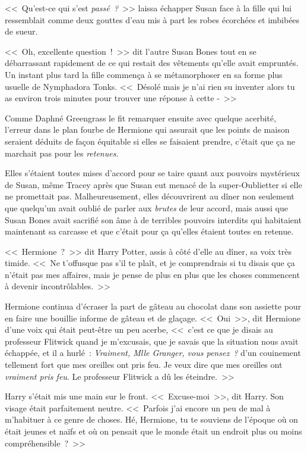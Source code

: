 <<~Qu'est-ce qui s'est \emph{passé~?}~>> laissa échapper Susan face à la fille qui lui ressemblait comme deux gouttes d'eau mis à part les robes écorchées et imbibées de sueur.

<<~Oh, excellente question~!~>> dit l'autre Susan Bones tout en se débarrassant rapidement de ce qui restait des vêtements qu'elle avait empruntés. Un instant plus tard la fille commença à se métamorphoser en sa forme plus usuelle de Nymphadora Tonks. <<~Désolé mais je n'ai rien su inventer alors tu as environ trois minutes pour trouver une réponse à cette -~>>

\later

Comme Daphné Greengrass le fit remarquer ensuite avec quelque acerbité, l'erreur dans le plan fourbe de Hermione qui assurait que les points de maison seraient déduits de façon équitable si elles se faisaient prendre, c'était que ça ne marchait pas pour les \emph{retenues}.

Elles s'étaient toutes mises d'accord pour se taire quant aux pouvoirs mystérieux de Susan, même Tracey après que Susan eut menacé de la super-Oublietter si elle ne promettait pas. Malheureusement, elles découvrirent au dîner non seulement que quelqu'un avait oublié de parler aux \emph{brutes} de leur accord, mais aussi que Susan Bones avait sacrifié son âme à de terribles pouvoirs interdits qui habitaient maintenant sa carcasse et que c'était pour ça qu'elles étaient toutes en retenue.

<<~Hermione~?~>> dit Harry Potter, assis à côté d'elle au dîner, sa voix très timide. <<~Ne t'offusque pas s'il te plaît, et je comprendrais si tu disais que ça n'était pas mes affaires, mais je pense de plus en plus que les choses commencent à devenir incontrôlables.~>>

Hermione continua d'écraser la part de gâteau au chocolat dans son assiette pour en faire une bouillie informe de gâteau et de glaçage. <<~Oui~>>, dit Hermione d'une voix qui était peut-être un peu acerbe, <<~c'est ce que je disais au professeur Flitwick quand je m'excusais, que je savais que la situation nous avait échappée, et il a hurlé~: \emph{Vraiment, Mlle Granger, vous pensez~?} d'un couinement tellement fort que mes oreilles ont pris feu. Je veux dire que mes oreilles ont \emph{vraiment pris feu}. Le professeur Flitwick a dû les éteindre.~>>

Harry s'était mis une main sur le front. <<~Excuse-moi~>>, dit Harry. Son visage était parfaitement neutre. <<~Parfois j'ai encore un peu de mal à m'habituer à ce genre de choses. Hé, Hermione, tu te souviens de l'époque où on était jeunes et naïfs et où on pensait que le monde était un endroit plus ou moins compréhensible~?~>>

